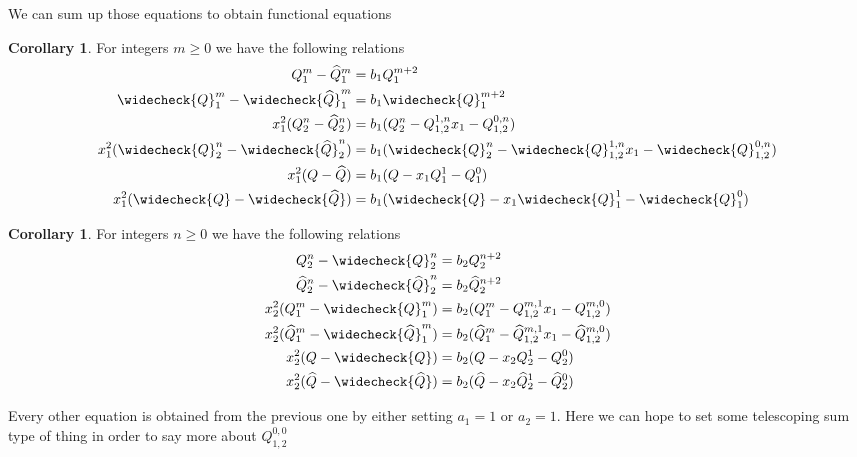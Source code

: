 \documentclass[12pt]{article}
\theoremstyle{definition} \newtheorem{definition}[theorem]{Definition}
\newtheorem{corollary}[theorem]{Corollary}
\newcommand{\wh}{\widehat}
\newcommand{\wc}{\widecheck}
\begin{document}
We can sum up those equations to obtain functional equations
\begin{corollary} For integers $m \ge 0$ we have the following relations
\begin{align*}
Q_1^m - \wh{Q}_1^m &= b_1 Q_1^{m+2}\\
\wc{Q}_1^m - \wc{\wh{Q}}_1^m &= b_1 \wc{Q}_1^{m+2}\\
x_1^2(Q_2^n-\wh{Q}_2^n) &= b_1 (Q_2^n - Q_{1,2}^{1,n}x_1 - Q_{1,2}^{0,n})\\
x_1^2(\wc{Q}_2^n-\wc{\wh{Q}}_2^n) &= b_1 (\wc{Q}_2^n - \wc{Q}_{1,2}^{1,n}x_1 - \wc{Q}_{1,2}^{0,n})\\
x_1^2(Q-\wh{Q}) &= b_1(Q-x_1Q_1^1-Q_1^0)\\
x_1^2(\wc{Q}-\wc{\wh{Q}}) &= b_1(\wc{Q}-x_1\wc{Q}_1^1-\wc{Q}_1^0)
\end{align*}
\end{corollary}

\begin{corollary} For integers $n \ge 0$ we have the following relations
\begin{align*}
Q_2^n-\wc{Q}_2^n &= b_2 Q_2^{n+2}\\
\wh{Q}_2^n-\wc{\wh{Q}}_2^n &= b_2 \wh{Q}_2^{n+2}\\
x_2^2(Q_1^m-\wc{Q}_1^m) &=  b_2 (Q_1^m - Q_{1,2}^{m,1}x_1 - Q_{1,2}^{m,0})\\
x_2^2(\wh{Q}_1^m-\wc{\wh{Q}}_1^m) &=  b_2 (\wh{Q}_1^m - \wh{Q}_{1,2}^{m,1}x_1 - \wh{Q}_{1,2}^{m,0})\\
x_2^2(Q-\wc{Q}) &= b_2(Q-x_2Q_2^1-Q_2^0)\\
x_2^2(\wh{Q}-\wc{\wh{Q}}) &= b_2(\wh{Q}-x_2\wh{Q}_2^1-\wh{Q}_2^0)
\end{align*}
\end{corollary}
Every other equation is obtained from the previous one by either setting $a_1 = 1$ or $a_2 = 1$. Here we can hope to set some telescoping sum type of thing in order to say more about $Q_{1,2}^{0,0}$
\end{document}
